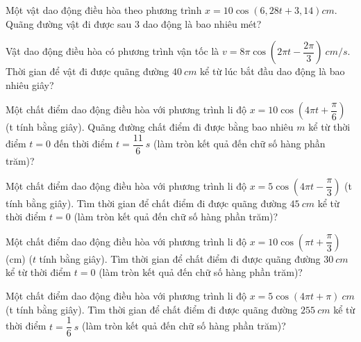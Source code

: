   \setcounter{ex}{0}
  \PhanIII
    \begin{ex}
    	Một vật dao động điều hòa theo phương trình $x=10 \cos (6,28 t+3,14) cm$. Quãng đường vật đi được sau 3 dao động là bao nhiêu mét?
    \end{ex}
    \begin{ex}
    	Vật dao động điều hòa có phương trình vận tốc là $v=8 \pi \cos \left(2 \pi t-\dfrac{2 \pi}{3}\right)\ cm/s$. Thời gian để vật đi được quãng đường $40\ cm$ kể từ lúc bắt đầu dao động là bao nhiêu giây?
    	\loigiai{
    	}
    \end{ex}
    \begin{ex}
  	Một chất điểm dao động điều hòa với phương trình li độ $x=10 \cos \left(4 \pi t+\dfrac{\pi}{6}\right)$
  	(t tính bằng giây). Quãng đường chất điểm đi được bằng bao nhiêu $m$ kể từ thời điểm $t=0$ đến thời điểm $t=\dfrac{11}{6} \ s$ (làm tròn kết quả đến chữ số hàng phần trăm)?\\
  \end{ex} 
  \begin{ex}
  	Một chất điểm dao động điều hòa với phương trình li độ $x=5 \cos \left(4 \pi t-\dfrac{\pi}{3}\right)$ (t tính bằng giây). Tìm thời gian để chất điểm đi được quãng đường $45 \ cm$ kể từ thời điểm $t=0$ (làm tròn kết quả đến chữ số hàng phần trăm)?\\
  \end{ex} 
  \begin{ex}
  	Một chất điểm dao động điều hòa với phương trình li độ $x=10 \cos \left(\pi t+\dfrac{\pi}{3}\right)$
  	(cm) ($t$ tính bằng giây). Tìm thời gian để chất điểm đi được quãng đường $30 \ cm$ kể từ thời điểm $t=0$ (làm tròn kết quả đến chữ số hàng phần trăm)?\\
  \end{ex} 
  \begin{ex}
  	Một chất điểm dao động điều hòa với phương trình li độ $x=5 \cos (4 \pi t+\pi)\ cm$ (t tính bằng giây). Tìm thời gian để chất điểm đi được quãng đường $255 \ cm$ kể từ thời điểm $t=\dfrac{1}{6} \ s$ (làm tròn kết quả đến chữ số hàng phần trăm)?\\
  \end{ex} 
  
  
  
  
  